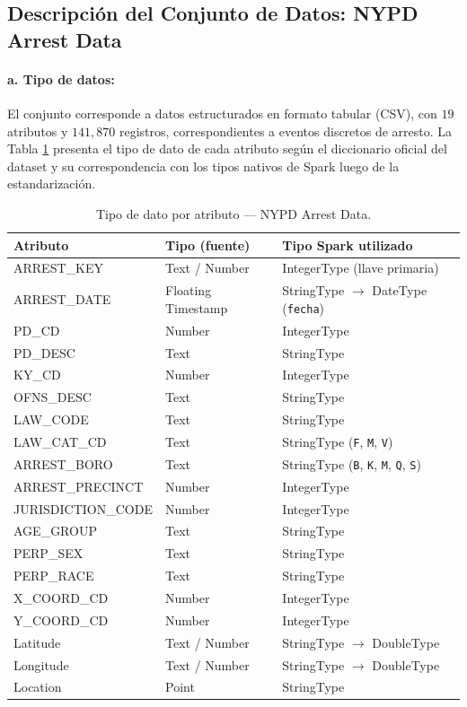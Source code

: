 \documentclass[11pt,a4paper]{article}
\begin{document}
\subsection{Descripción del Conjunto de Datos: NYPD Arrest Data}
\label{subsec:desc_arrest_data}

\paragraph{a. Tipo de datos:} El conjunto corresponde a datos estructurados en formato tabular (CSV), con $19$ atributos y $141,870$ registros, correspondientes a eventos discretos de arresto. La Tabla \ref{tab:tipos_arrest_data} presenta el tipo de dato de cada atributo según el diccionario oficial del dataset y su correspondencia con los tipos nativos de Spark luego de la estandarización.

\begin{table}[H]
\centering
\small
\caption{Tipo de dato por atributo --- NYPD Arrest Data.}
\label{tab:tipos_arrest_data}
\begin{tabular}{l l l}
\toprule
\textbf{Atributo} & \textbf{Tipo (fuente)} & \textbf{Tipo Spark utilizado} \\
\midrule
ARREST\_KEY & Text / Number & IntegerType (llave primaria) \\
ARREST\_DATE & Floating Timestamp & StringType $\rightarrow$ DateType (\texttt{fecha}) \\
PD\_CD & Number & IntegerType \\
PD\_DESC & Text & StringType \\
KY\_CD & Number & IntegerType \\
OFNS\_DESC & Text & StringType \\
LAW\_CODE & Text & StringType \\
LAW\_CAT\_CD & Text & StringType (\texttt{F}, \texttt{M}, \texttt{V}) \\
ARREST\_BORO & Text & StringType (\texttt{B}, \texttt{K}, \texttt{M}, \texttt{Q}, \texttt{S}) \\
ARREST\_PRECINCT & Number & IntegerType \\
JURISDICTION\_CODE & Number & IntegerType \\
AGE\_GROUP & Text & StringType \\
PERP\_SEX & Text & StringType \\
PERP\_RACE & Text & StringType \\
X\_COORD\_CD & Number & IntegerType \\
Y\_COORD\_CD & Number & IntegerType \\
Latitude & Text / Number & StringType $\rightarrow$ DoubleType \\
Longitude & Text / Number & StringType $\rightarrow$ DoubleType \\
Location & Point & StringType \\
\bottomrule
\end{tabular}
\end{table}
\end{document}
